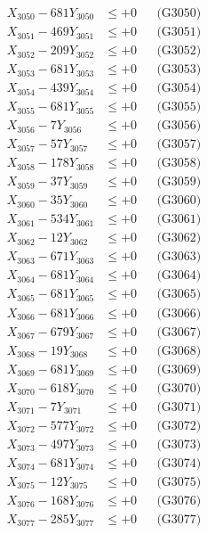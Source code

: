 \documentclass[a4paper,10pt]{article}
\begin{document}
{\begin{align}
X_{3050} - 681Y_{3050} &\leq +0 && \text{(G3050)} \\
\allowbreak
X_{3051} - 469Y_{3051} &\leq +0 && \text{(G3051)} \\
X_{3052} - 209Y_{3052} &\leq +0 && \text{(G3052)} \\
X_{3053} - 681Y_{3053} &\leq +0 && \text{(G3053)} \\
X_{3054} - 439Y_{3054} &\leq +0 && \text{(G3054)} \\
X_{3055} - 681Y_{3055} &\leq +0 && \text{(G3055)} \\
X_{3056} - 7Y_{3056} &\leq +0 && \text{(G3056)} \\
X_{3057} - 57Y_{3057} &\leq +0 && \text{(G3057)} \\
X_{3058} - 178Y_{3058} &\leq +0 && \text{(G3058)} \\
X_{3059} - 37Y_{3059} &\leq +0 && \text{(G3059)} \\
X_{3060} - 35Y_{3060} &\leq +0 && \text{(G3060)} \\
\allowbreak
X_{3061} - 534Y_{3061} &\leq +0 && \text{(G3061)} \\
X_{3062} - 12Y_{3062} &\leq +0 && \text{(G3062)} \\
X_{3063} - 671Y_{3063} &\leq +0 && \text{(G3063)} \\
X_{3064} - 681Y_{3064} &\leq +0 && \text{(G3064)} \\
X_{3065} - 681Y_{3065} &\leq +0 && \text{(G3065)} \\
X_{3066} - 681Y_{3066} &\leq +0 && \text{(G3066)} \\
X_{3067} - 679Y_{3067} &\leq +0 && \text{(G3067)} \\
X_{3068} - 19Y_{3068} &\leq +0 && \text{(G3068)} \\
X_{3069} - 681Y_{3069} &\leq +0 && \text{(G3069)} \\
X_{3070} - 618Y_{3070} &\leq +0 && \text{(G3070)} \\
\allowbreak
X_{3071} - 7Y_{3071} &\leq +0 && \text{(G3071)} \\
X_{3072} - 577Y_{3072} &\leq +0 && \text{(G3072)} \\
X_{3073} - 497Y_{3073} &\leq +0 && \text{(G3073)} \\
X_{3074} - 681Y_{3074} &\leq +0 && \text{(G3074)} \\
X_{3075} - 12Y_{3075} &\leq +0 && \text{(G3075)} \\
X_{3076} - 168Y_{3076} &\leq +0 && \text{(G3076)} \\
X_{3077} - 285Y_{3077} &\leq +0 && \text{(G3077)} \\

\end{align}}
\end{document}

